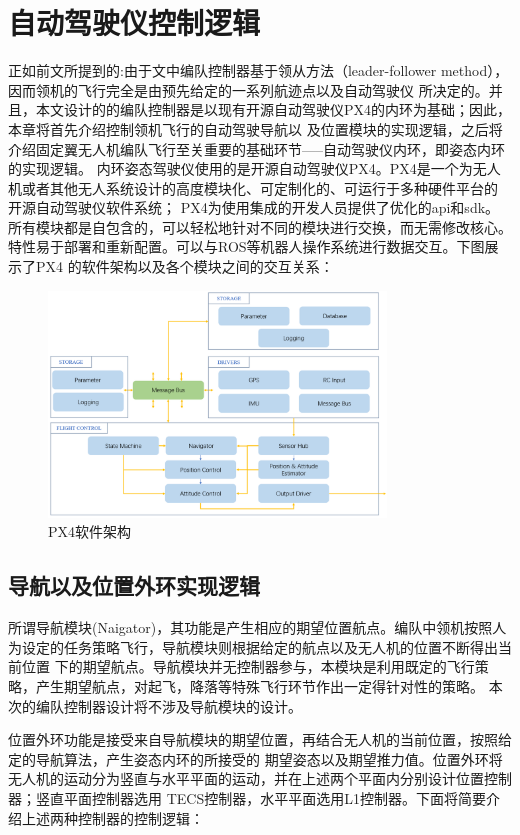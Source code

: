 \section{自动驾驶仪控制逻辑}
正如前文所提到的:由于文中编队控制器基于领从方法（leader-follower method），因而领机的飞行完全是由预先给定的一系列航迹点以及自动驾驶仪
所决定的。并且，本文设计的的编队控制器是以现有开源自动驾驶仪PX4的内环为基础；因此，本章将首先介绍控制领机飞行的自动驾驶导航以
及位置模块的实现逻辑，之后将介绍固定翼无人机编队飞行至关重要的基础环节-----自动驾驶仪内环，即姿态内环的实现逻辑。
内环姿态驾驶仪使用的是开源自动驾驶仪PX4。PX4是一个为无人机或者其他无人系统设计的高度模块化、可定制化的、可运行于多种硬件平台的
开源自动驾驶仪软件系统；
PX4为使用集成的开发人员提供了优化的api和sdk。所有模块都是自包含的，可以轻松地针对不同的模块进行交换，而无需修改核心。特性易于部署和重新配置。可以与ROS等机器人操作系统进行数据交互。下图展示了PX4
的软件架构以及各个模块之间的交互关系：
\begin{figure}[H]
    \centering
    \includegraphics[width=0.8\textwidth]{figures/c4/PX4_archticher.png}
    \caption{PX4软件架构}\label{fig:PX4_archticher.png}
\end{figure}
\subsection{导航以及位置外环实现逻辑}
所谓导航模块(Naigator)，其功能是产生相应的期望位置航点。编队中领机按照人为设定的任务策略飞行，导航模块则根据给定的航点以及无人机的位置不断得出当前位置
下的期望航点。导航模块并无控制器参与，本模块是利用既定的飞行策略，产生期望航点，对起飞，降落等特殊飞行环节作出一定得针对性的策略。
本次的编队控制器设计将不涉及导航模块的设计。

位置外环功能是接受来自导航模块的期望位置，再结合无人机的当前位置，按照给定的导航算法，产生姿态内环的所接受的
期望姿态以及期望推力值。位置外环将无人机的运动分为竖直与水平平面的运动，并在上述两个平面内分别设计位置控制器；竖直平面控制器选用
TECS控制器，水平平面选用L1控制器。下面将简要介绍上述两种控制器的控制逻辑：
